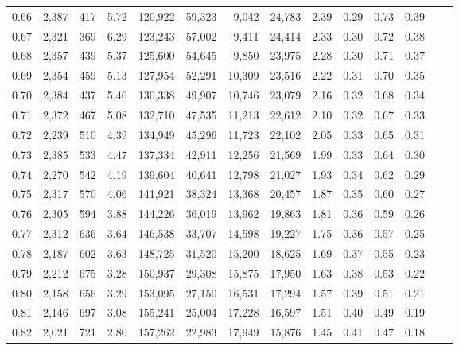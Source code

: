\begin{tabular}{rrrrrrrrrrrrrr}
0.66 &  2,387 &    417 &    5.72 &  120,922 &   59,323 &   9,042 &  24,783 &  2.39 &  0.29 &  0.73 &      0.39 \\
0.67 &  2,321 &    369 &    6.29 &  123,243 &   57,002 &   9,411 &  24,414 &  2.33 &  0.30 &  0.72 &      0.38 \\
0.68 &  2,357 &    439 &    5.37 &  125,600 &   54,645 &   9,850 &  23,975 &  2.28 &  0.30 &  0.71 &      0.37 \\
0.69 &  2,354 &    459 &    5.13 &  127,954 &   52,291 &  10,309 &  23,516 &  2.22 &  0.31 &  0.70 &      0.35 \\
0.70 &  2,384 &    437 &    5.46 &  130,338 &   49,907 &  10,746 &  23,079 &  2.16 &  0.32 &  0.68 &      0.34 \\
0.71 &  2,372 &    467 &    5.08 &  132,710 &   47,535 &  11,213 &  22,612 &  2.10 &  0.32 &  0.67 &      0.33 \\
0.72 &  2,239 &    510 &    4.39 &  134,949 &   45,296 &  11,723 &  22,102 &  2.05 &  0.33 &  0.65 &      0.31 \\
0.73 &  2,385 &    533 &    4.47 &  137,334 &   42,911 &  12,256 &  21,569 &  1.99 &  0.33 &  0.64 &      0.30 \\
0.74 &  2,270 &    542 &    4.19 &  139,604 &   40,641 &  12,798 &  21,027 &  1.93 &  0.34 &  0.62 &      0.29 \\
0.75 &  2,317 &    570 &    4.06 &  141,921 &   38,324 &  13,368 &  20,457 &  1.87 &  0.35 &  0.60 &      0.27 \\
0.76 &  2,305 &    594 &    3.88 &  144,226 &   36,019 &  13,962 &  19,863 &  1.81 &  0.36 &  0.59 &      0.26 \\
0.77 &  2,312 &    636 &    3.64 &  146,538 &   33,707 &  14,598 &  19,227 &  1.75 &  0.36 &  0.57 &      0.25 \\
0.78 &  2,187 &    602 &    3.63 &  148,725 &   31,520 &  15,200 &  18,625 &  1.69 &  0.37 &  0.55 &      0.23 \\
0.79 &  2,212 &    675 &    3.28 &  150,937 &   29,308 &  15,875 &  17,950 &  1.63 &  0.38 &  0.53 &      0.22 \\
0.80 &  2,158 &    656 &    3.29 &  153,095 &   27,150 &  16,531 &  17,294 &  1.57 &  0.39 &  0.51 &      0.21 \\
0.81 &  2,146 &    697 &    3.08 &  155,241 &   25,004 &  17,228 &  16,597 &  1.51 &  0.40 &  0.49 &      0.19 \\
0.82 &  2,021 &    721 &    2.80 &  157,262 &   22,983 &  17,949 &  15,876 &  1.45 &  0.41 &  0.47 &      0.18 \\

\end{tabular}
